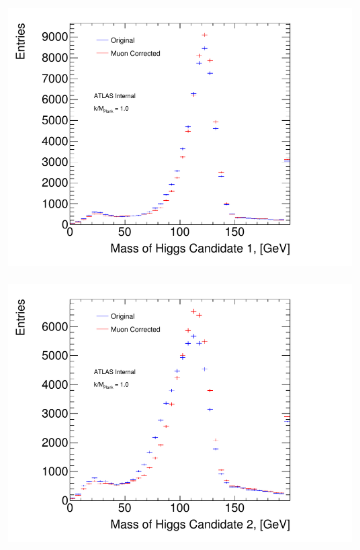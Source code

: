 \begin{figure}[htb!]
\begin{center}
    \captionsetup{justification=centering}
    \begin{subfigure}[b]{0.45\textwidth}
        \includegraphics[width=\textwidth]{figures/boosted/muons/h1_mass_dbl.pdf}
        \caption{\mleadJ}
        \label{fig:boosted-muons-signal-leadj}
    \end{subfigure}
    \quad
    \begin{subfigure}[b]{0.45\textwidth}
        \includegraphics[width=\textwidth]{figures/boosted/muons/h2_mass_dbl.pdf}
        \caption{\msublJ}
        \label{fig:boosted-muons-signal-sublj}
    \end{subfigure}\\

\end{center}
\end{figure}

